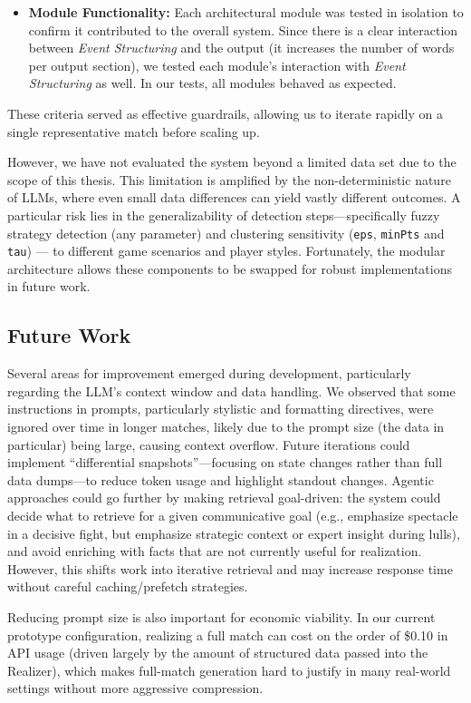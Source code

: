 \begin{itemize}
  \item \textbf{Module Functionality:} Each architectural module was tested in isolation to confirm it contributed to the overall system. Since there is a clear interaction between \textit{Event Structuring} and the output (it increases the number of words per output section), we tested each module's interaction with \textit{Event Structuring} as well. In our tests, all modules behaved as expected.
\end{itemize}

These criteria served as effective guardrails, allowing us to iterate rapidly on a single representative match before scaling up.

However, we have not evaluated the system beyond a limited data set due to the scope of this thesis. This limitation is amplified by the non-deterministic nature of LLMs, where even small data differences can yield vastly different outcomes. A particular risk lies in the generalizability of detection steps—specifically fuzzy strategy detection (any parameter) and clustering sensitivity (\texttt{eps}, \texttt{minPts} and \texttt{tau}) — to different game scenarios and player styles. Fortunately, the modular architecture allows these components to be swapped for robust implementations in future work.

\subsection{Future Work}
Several areas for improvement emerged during development, particularly regarding the LLM's context window and data handling. We observed that some instructions in prompts, particularly stylistic and formatting directives, were ignored over time in longer matches, likely due to the prompt size (the data in particular) being large, causing context overflow. Future iterations could implement ``differential snapshots''—focusing on state changes rather than full data dumps—to reduce token usage and highlight standout changes. Agentic approaches could go further by making retrieval goal-driven: the system could decide what to retrieve for a given communicative goal (e.g., emphasize spectacle in a decisive fight, but emphasize strategic context or expert insight during lulls), and avoid enriching with facts that are not currently useful for realization. However, this shifts work into iterative retrieval and may increase response time without careful caching/prefetch strategies.

Reducing prompt size is also important for economic viability. In our current prototype configuration, realizing a full match can cost on the order of \$0.10 in API usage (driven largely by the amount of structured data passed into the Realizer), which makes full-match generation hard to justify in many real-world settings without more aggressive compression.


